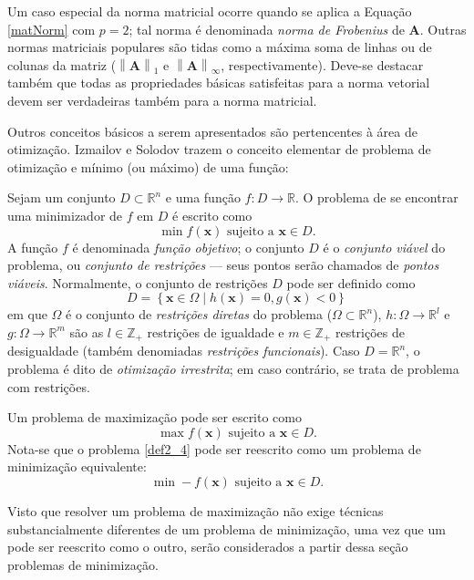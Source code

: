 Um caso especial da norma matricial ocorre quando se aplica a Equa\c{c}\~{a}o \eqref{matNorm} com $p = 2$; tal norma \'{e} denominada \textit{norma de Frobenius} de $\mathbf{A}$. Outras normas matriciais populares s\~{a}o tidas como a m\'{a}xima soma de linhas ou de colunas da matriz ($\left\|\mathbf{A}\right\|_{1}$ e $\left\|\mathbf{A}\right\|_{\infty}$, respectivamente). Deve-se destacar tamb\'{e}m que todas as propriedades b\'{a}sicas satisfeitas para a norma vetorial devem ser verdadeiras tamb\'{e}m para a norma matricial.

Outros conceitos b\'{a}sicos a serem apresentados s\~{a}o pertencentes \`{a} \'{a}rea de otimiza\c{c}\~{a}o. Izmailov e Solodov \cite{izmailov} trazem o conceito elementar de problema de otimiza\c{c}\~{a}o e m\'{i}nimo (ou m\'{a}ximo) de uma fun\c{c}\~{a}o:

\begin{definition} 
Sejam um conjunto $D \subset \mathbb{R}^{n}$ e uma fun\c{c}\~{a}o $f: D \to \mathbb{R}$. O problema de se encontrar uma minimizador de $f$ em $D$ \'{e} escrito como
\begin{equation}
\label{basicProb}
\min f(\mathbf{x}) \text{ sujeito a } \mathbf{x} \in D.
\end{equation} A fun\c{c}\~{a}o $f$ \'{e} denominada \textit{fun\c{c}\~{a}o objetivo}; o conjunto $D$ \'{e} o \textit{conjunto vi\'{a}vel} do problema, ou \textit{conjunto de restri\c{c}\~{o}es} --- seus pontos ser\~{a}o chamados de \textit{pontos vi\'{a}veis}. Normalmente, o conjunto de restri\c{c}\~{o}es $D$ pode ser definido como
\begin{equation}
D = \left\lbrace \mathbf{x} \in \Omega \mid h(\mathbf{x}) = 0, g(\mathbf{x}) < 0 \right\rbrace
\end{equation} em que $\Omega$ \'{e} o conjunto de \textit{restri\c{c}\~{o}es diretas} do problema ($\Omega \subset \mathbb{R}^{n}$), $h: \Omega \to \mathbb{R}^{l}$ e $g: \Omega \to \mathbb{R}^{m}$ s\~{a}o as $l \in \mathbb{Z}_{+}$ restri\c{c}\~{o}es de igualdade e $m \in \mathbb{Z}_{+}$ restri\c{c}\~{o}es de desigualdade (tamb\'{e}m denomiadas \textit{restri\c{c}\~{o}es funcionais}). Caso $D = \mathbb{R}^{n}$, o problema \'{e} dito de \textit{otimiza\c{c}\~{a}o irrestrita}; em caso contr\'{a}rio, se trata de problema com restri\c{c}\~{o}es.
\end{definition} 
\begin{definition} 
Um problema de maximiza\c{c}\~{a}o pode ser escrito como
\begin{equation}
\label{def2_4}
\max f(\mathbf{x}) \text{ sujeito a } \mathbf{x} \in D.
\end{equation} 
Nota-se que o problema \eqref{def2_4} pode ser reescrito como um problema de minimiza\c{c}\~{a}o equivalente:
\begin{equation*}
\min -f(\mathbf{x}) \text{ sujeito a } \mathbf{x} \in D.
\end{equation*}
\end{definition}  
Visto que resolver um problema de maximiza\c{c}\~{a}o n\~{a}o exige t\'{e}cnicas substancialmente diferentes de um problema de minimiza\c{c}\~{a}o, uma vez que um pode ser reescrito como o outro, ser\~{a}o considerados a partir dessa se\c{c}\~{a}o problemas de minimiza\c{c}\~{a}o.

